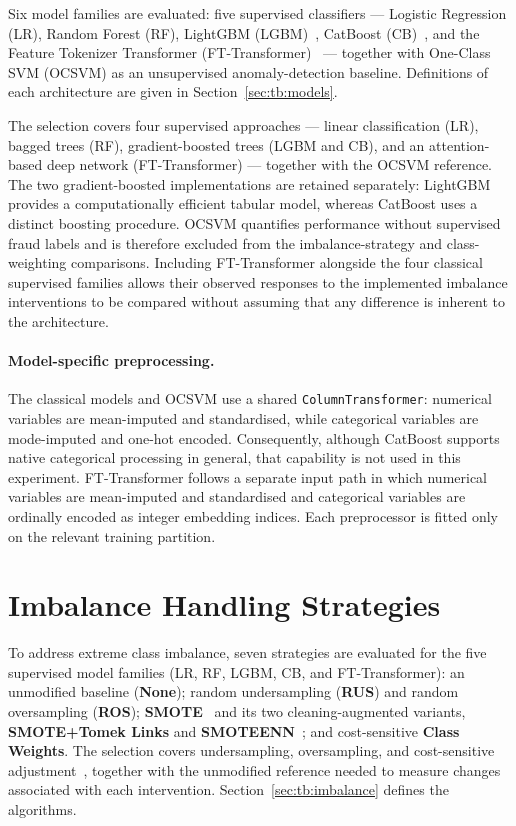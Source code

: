 Six model families are evaluated: five supervised classifiers --- Logistic Regression (LR), Random Forest (RF), LightGBM (LGBM)~\cite{ke2017lightgbm}, CatBoost (CB)~\cite{prokhorenkova2018catboost}, and the Feature Tokenizer Transformer (FT-Transformer)~\cite{gorishniy2021revisiting} --- together with One-Class SVM (OCSVM) as an unsupervised anomaly-detection baseline. Definitions of each architecture are given in Section~\ref{sec:tb:models}.

The selection covers four supervised approaches --- linear classification (LR), bagged trees (RF), gradient-boosted trees (LGBM and CB), and an attention-based deep network (FT-Transformer) --- together with the OCSVM reference. The two gradient-boosted implementations are retained separately: LightGBM provides a computationally efficient tabular model, whereas CatBoost uses a distinct boosting procedure. OCSVM quantifies performance without supervised fraud labels and is therefore excluded from the imbalance-strategy and class-weighting comparisons. Including FT-Transformer alongside the four classical supervised families allows their observed responses to the implemented imbalance interventions to be compared without assuming that any difference is inherent to the architecture.

\paragraph{Model-specific preprocessing.}
The classical models and OCSVM use a shared \texttt{ColumnTransformer}: numerical variables are mean-imputed and standardised, while categorical variables are mode-imputed and one-hot encoded. Consequently, although CatBoost supports native categorical processing in general, that capability is not used in this experiment. FT-Transformer follows a separate input path in which numerical variables are mean-imputed and standardised and categorical variables are ordinally encoded as integer embedding indices. Each preprocessor is fitted only on the relevant training partition.

\section{Imbalance Handling Strategies}
\label{sec:imbalance_strategies}

To address extreme class imbalance, seven strategies are evaluated for the five supervised model families (LR, RF, LGBM, CB, and FT-Transformer): an unmodified baseline (\textbf{None}); random undersampling (\textbf{RUS}) and random oversampling (\textbf{ROS}); \textbf{SMOTE}~\cite{chawla2002smote} and its two cleaning-augmented variants, \textbf{SMOTE+Tomek Links} and \textbf{SMOTEENN}~\cite{batista2004balancing}; and cost-sensitive \textbf{Class Weights}. The selection covers undersampling, oversampling, and cost-sensitive adjustment~\cite{hegarcia2009learning, krawczyk2016learning}, together with the unmodified reference needed to measure changes associated with each intervention. Section~\ref{sec:tb:imbalance} defines the algorithms.


